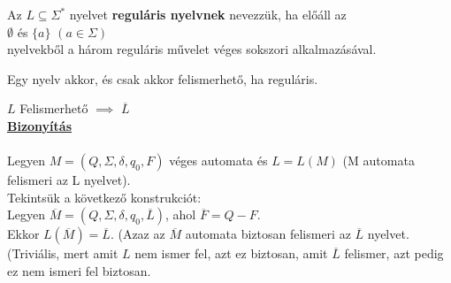 \begin{frame}

\begin{tcolorbox}[title={Def.: Reguláris nyelv}]
Az $L \subseteq {\Sigma}^*$ nyelvet \textbf{reguláris nyelvnek} nevezzük, ha előáll az\\
$\emptyset$ és $\{a\}$ $(a \in {\Sigma})$\\
nyelvekből a három reguláris művelet véges sokszori alkalmazásával.
\end{tcolorbox}

\begin{tcolorbox}[title={Tétel: Kleene tétel}]
Egy nyelv akkor, és csak akkor felismerhető, ha reguláris.
\end{tcolorbox}

\end{frame}

\begin{frame}
\begin{tcolorbox}[title={Tétel: Felismerhető nyelvek komplementere}]
$L$ Felismerhető $\implies$ $\overline{L}$\\
\tcblower
\msmallskip
\underline{\textbf{Bizonyítás}}\\
\mmedskip
\\
Legyen $M = (Q, \Sigma , \delta , q_0, F)$ véges automata és $L = L(M)$ (M automata felismeri az L nyelvet).\\
Tekintsük a következő konstrukciót:\\
Legyen $\overline{M} = (Q, \Sigma , \delta, q_0, \overline{L})$, ahol $\overline{F} = Q - F$.\\
Ekkor  $L(\overline{M}) = \overline{L}$. (Azaz az $\overline{M}$ automata biztosan felismeri az $\overline{L}$ nyelvet.\\ 
(Triviális, mert amit $L$ nem ismer fel, azt ez biztosan, amit $\overline{L}$ felismer, azt pedig ez nem ismeri fel biztosan.

\end{tcolorbox}

\end{frame}

